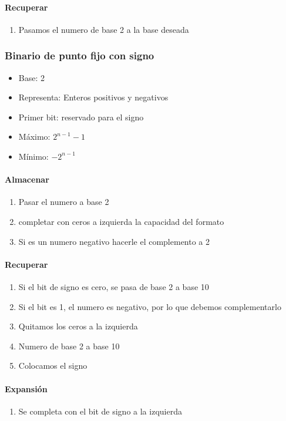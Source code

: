\paragraph{Recuperar}
\begin{enumerate}
\item Pasamos el numero de base 2 a la base deseada 
\end{enumerate}

\subsubsection{Binario de punto fijo con signo}
\begin{itemize}
\item Base: 2
\item Representa: Enteros positivos y negativos
\item Primer bit: reservado para el signo
\item Máximo: $2^{n-1}-1$
\item Mínimo: $-2^{n-1}$
\end{itemize}

\paragraph{Almacenar}
\begin{enumerate}
\item Pasar el numero a base 2
\item completar con ceros a izquierda la capacidad del formato
\item Si es un numero negativo hacerle el complemento a 2
\end{enumerate}
\paragraph{Recuperar}
\begin{enumerate}
\item Si el bit de signo es cero, se pasa de base 2 a base 10
\item Si el bit es 1, el numero es negativo, por lo que debemos complementarlo
\item Quitamos los ceros a la izquierda
\item Numero de base 2 a base 10
\item Colocamos el signo
\end{enumerate}

\paragraph{Expansión}
\begin{enumerate}
\item Se completa con el bit de signo a la izquierda
\end{enumerate}
